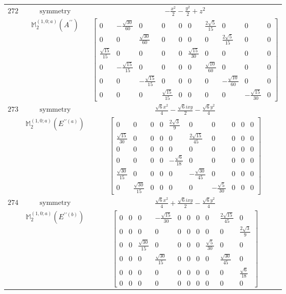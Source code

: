 \documentclass[fleqn,8pt,landscape]{jsarticle}
\begin{document}
\begin{longtable}{ccc}
$ 272 $ & $ \text{symmetry} $ & $ - \frac{x^{2}}{2} - \frac{y^{2}}{2} + z^{2} $ \\
$  $ & $ \mathbb{M}_{2}^{(1,0;a)}(A^{\prime\prime}) $ & $ \begin{bmatrix} 0 & - \frac{\sqrt{30}}{60} & 0 & 0 & 0 & 0 & \frac{2 \sqrt{5}}{15} & 0 & 0 & 0 \\ 0 & 0 & \frac{\sqrt{30}}{60} & 0 & 0 & 0 & 0 & \frac{2 \sqrt{5}}{15} & 0 & 0 \\ \frac{\sqrt{15}}{15} & 0 & 0 & 0 & 0 & \frac{\sqrt{15}}{30} & 0 & 0 & 0 & 0 \\ 0 & - \frac{\sqrt{15}}{15} & 0 & 0 & 0 & 0 & \frac{\sqrt{10}}{60} & 0 & 0 & 0 \\ 0 & 0 & - \frac{\sqrt{15}}{15} & 0 & 0 & 0 & 0 & - \frac{\sqrt{10}}{60} & 0 & 0 \\ 0 & 0 & 0 & \frac{\sqrt{15}}{15} & 0 & 0 & 0 & 0 & - \frac{\sqrt{15}}{30} & 0 \end{bmatrix} $ \\ \hline
$ 273 $ & $ \text{symmetry} $ & $ \frac{\sqrt{6} x^{2}}{4} - \frac{\sqrt{6} i x y}{2} - \frac{\sqrt{6} y^{2}}{4} $ \\
$  $ & $ \mathbb{M}_{2}^{(1,0;a)}(E^{\prime\prime(a)}) $ & $ \begin{bmatrix} 0 & 0 & 0 & 0 & \frac{2 \sqrt{3}}{9} & 0 & 0 & 0 & 0 & 0 \\ \frac{\sqrt{15}}{30} & 0 & 0 & 0 & 0 & \frac{2 \sqrt{15}}{45} & 0 & 0 & 0 & 0 \\ 0 & 0 & 0 & 0 & 0 & 0 & 0 & 0 & 0 & 0 \\ 0 & 0 & 0 & 0 & - \frac{\sqrt{6}}{18} & 0 & 0 & 0 & 0 & 0 \\ \frac{\sqrt{30}}{15} & 0 & 0 & 0 & 0 & - \frac{\sqrt{30}}{45} & 0 & 0 & 0 & 0 \\ 0 & \frac{\sqrt{30}}{15} & 0 & 0 & 0 & 0 & - \frac{\sqrt{5}}{30} & 0 & 0 & 0 \end{bmatrix} $ \\ \hline
$ 274 $ & $ \text{symmetry} $ & $ \frac{\sqrt{6} x^{2}}{4} + \frac{\sqrt{6} i x y}{2} - \frac{\sqrt{6} y^{2}}{4} $ \\
$  $ & $ \mathbb{M}_{2}^{(1,0;a)}(E^{\prime\prime(b)}) $ & $ \begin{bmatrix} 0 & 0 & 0 & - \frac{\sqrt{15}}{30} & 0 & 0 & 0 & 0 & \frac{2 \sqrt{15}}{45} & 0 \\ 0 & 0 & 0 & 0 & 0 & 0 & 0 & 0 & 0 & \frac{2 \sqrt{3}}{9} \\ 0 & 0 & \frac{\sqrt{30}}{15} & 0 & 0 & 0 & 0 & \frac{\sqrt{5}}{30} & 0 & 0 \\ 0 & 0 & 0 & \frac{\sqrt{30}}{15} & 0 & 0 & 0 & 0 & \frac{\sqrt{30}}{45} & 0 \\ 0 & 0 & 0 & 0 & 0 & 0 & 0 & 0 & 0 & \frac{\sqrt{6}}{18} \\ 0 & 0 & 0 & 0 & 0 & 0 & 0 & 0 & 0 & 0 \end{bmatrix} $ \\ \hline

\end{longtable}
\end{document}
